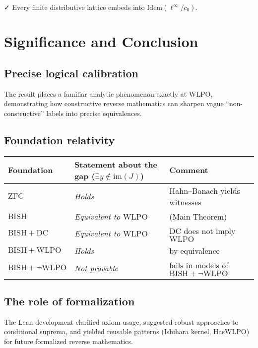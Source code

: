 \documentclass[11pt]{article}
\newcommand{\leanok}{\textsf{\small \textcolor{green!70!black}{✓}}}
\newcommand{\linf}{\ell^\infty}
\newcommand{\cnull}{c_0}
\newcommand{\WLPO}{\mathrm{WLPO}}
\newcommand{\BISH}{\mathrm{BISH}}
\newcommand{\DC}{\mathrm{DC}}
\newcommand{\ZFC}{\mathrm{ZFC}}
\begin{document}
\begin{cor}\leanok
Every finite distributive lattice embeds into $\mathrm{Idem}(\linf/\cnull)$.
\end{cor}

\section{Significance and Conclusion}

\subsection{Precise logical calibration}

The result places a familiar analytic phenomenon exactly at $\WLPO$, demonstrating how constructive reverse mathematics can sharpen vague ``non-constructive'' labels into precise equivalences.

\subsection{Foundation relativity}

\begin{center}
\small %
\begin{tabular}{lll}
\toprule
Foundation & Statement about the gap ($\exists y\notin \mathrm{im}(J)$) & Comment \\
\midrule
$\ZFC$ & \emph{Holds} & Hahn--Banach yields witnesses \\
$\BISH$ & \emph{Equivalent to $\WLPO$} & (Main Theorem) \\
$\BISH+\DC$ & \emph{Equivalent to $\WLPO$} & $\DC$ does not imply $\WLPO$ \\
$\BISH+\WLPO$ & \emph{Holds} & by equivalence \\
$\BISH+\neg\WLPO$ & \emph{Not provable} & fails in models of $\BISH+\neg\WLPO$ \\
\bottomrule
\end{tabular}
\end{center}

\subsection{The role of formalization}

The Lean development clarified axiom usage, suggested robust approaches to conditional suprema, and yielded reusable patterns (Ishihara kernel, HasWLPO) for future formalized reverse mathematics.
\end{document}
